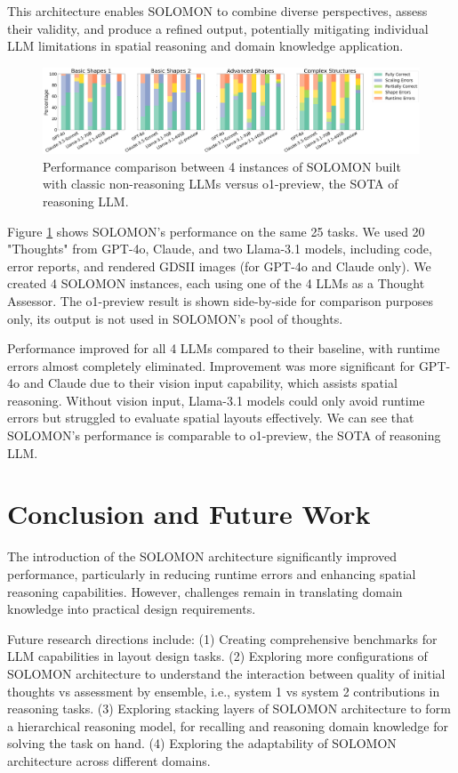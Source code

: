\documentclass{article}
\begin{document}
This architecture enables SOLOMON to combine diverse perspectives, assess their validity, and produce a refined output, potentially mitigating individual LLM limitations in spatial reasoning and domain knowledge application.
\begin{figure}[h]
  \centering
  \includegraphics[width=\textwidth]{output.png}
  \caption{Performance comparison between 4 instances of SOLOMON built with classic non-reasoning LLMs versus o1-preview, the SOTA of reasoning LLM.}
  \label{fig:judges-performance}
\end{figure}
Figure \ref{fig:judges-performance} shows SOLOMON's performance on the same 25 tasks. We used 20 "Thoughts" from GPT-4o, Claude, and two Llama-3.1 models, including code, error reports, and rendered GDSII images (for GPT-4o and Claude only). We created 4 SOLOMON instances, each using one of the 4 LLMs as a Thought Assessor. The o1-preview result is shown side-by-side for comparison purposes only, its output is not used in SOLOMON's pool of thoughts.

Performance improved for all 4 LLMs compared to their baseline, with runtime errors almost completely eliminated. Improvement was more significant for GPT-4o and Claude due to their vision input capability, which assists spatial reasoning. Without vision input, Llama-3.1 models could only avoid runtime errors but struggled to evaluate spatial layouts effectively. We can see that SOLOMON's performance is comparable to o1-preview, the SOTA of reasoning LLM.

\section{Conclusion and Future Work}
The introduction of the SOLOMON architecture significantly improved performance, particularly in reducing runtime errors and enhancing spatial reasoning capabilities. However, challenges remain in translating domain knowledge into practical design requirements.

Future research directions include:
(1) Creating comprehensive benchmarks for LLM capabilities in layout design tasks.
(2) Exploring more configurations of SOLOMON architecture to understand the interaction between quality of initial thoughts vs assessment by ensemble, i.e., system 1 vs system 2 contributions in reasoning tasks.
(3) Exploring stacking layers of SOLOMON architecture to form a hierarchical reasoning model, for recalling and reasoning domain knowledge for solving the task on hand.
(4) Exploring the adaptability of SOLOMON architecture across different domains.
\end{document}
